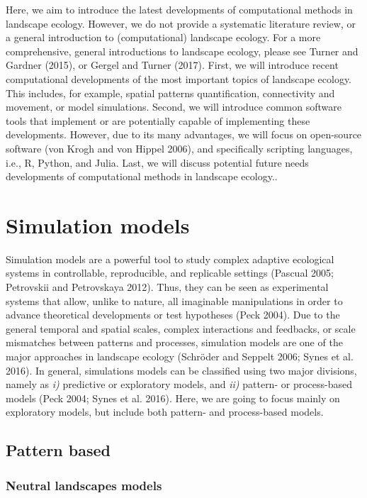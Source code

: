 \documentclass[
  12pt,
  a4paperpaper,
]{article}
\begin{document}
Here, we aim to introduce the latest developments of computational
methods in landscape ecology. However, we do not provide a systematic
literature review, or a general introduction to (computational)
landscape ecology. For a more comprehensive, general introductions to
landscape ecology, please see Turner and Gardner (2015), or Gergel and
Turner (2017). First, we will introduce recent computational
developments of the most important topics of landscape ecology. This
includes, for example, spatial patterns quantification, connectivity and
movement, or model simulations. Second, we will introduce common
software tools that implement or are potentially capable of implementing
these developments. However, due to its many advantages, we will focus
on open-source software (von Krogh and von Hippel 2006), and
specifically scripting languages, i.e., R, Python, and Julia. Last, we
will discuss potential future needs developments of computational
methods in landscape ecology..

\section{Simulation models}\label{simulation-models}

Simulation models are a powerful tool to study complex adaptive
ecological systems in controllable, reproducible, and replicable
settings (Pascual 2005; Petrovskii and Petrovskaya 2012). Thus, they can
be seen as experimental systems that allow, unlike to nature, all
imaginable manipulations in order to advance theoretical developments or
test hypotheses (Peck 2004). Due to the general temporal and spatial
scales, complex interactions and feedbacks, or scale mismatches between
patterns and processes, simulation models are one of the major
approaches in landscape ecology (Schröder and Seppelt 2006; Synes et al.
2016). In general, simulations models can be classified using two major
divisions, namely as \emph{i)} predictive or exploratory models, and
\emph{ii)} pattern- or process-based models (Peck 2004; Synes et al.
2016). Here, we are going to focus mainly on exploratory models, but
include both pattern- and process-based models.

\subsection{Pattern based}\label{pattern-based}

\subsubsection{Neutral landscapes
models}\label{neutral-landscapes-models}
\end{document}
